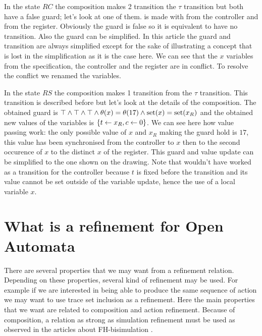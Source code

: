 \documentclass{article}
\begin{document}
\begin{exi}
In the state \(RC\) the composition makes 2 transition  the \(\tau\) transition but both have a false guard; let's look at one of them.
 is made with  from the controller and  from the register.
Obviously the guard is false so  it is equivalent to have no transition.
Also the guard  can be simplified.
In this article the guard and transition are always simplified except for the sake of illustrating a concept that is lost in the simplification as it is the case here.
We can see that the \(x\) variables from the specification, the controller and the register are in conflict.
To resolve the conflict we renamed the variables.

In the state \(RS\) the composition makes 1 transition from the \(\tau\) transition.
This transition is described before but let's look at the details of the composition.
The obtained guard is \(\top \wedge \top \wedge \top \wedge \theta{\left(x\right)} = \theta{\left(17\right)} \wedge \mathrm{set}{\left(x\right)} = \mathrm{set}{\left(x_R\right)}\) and the obtained new values of the variables is \({\left\{t \gets x_R, c \gets 0\right\}}\).
We can see here how value passing work: the only possible value of \(x\) and \(x_R\) making the guard hold is \(17\), this value has been synchronised from the controller to \(x\) then to the second occurence of \(x\) to the distinct \(x\) of the register.
This guard and value update can be simplified to the one shown on the drawing.
Note that  wouldn't have worked as a transition for the controller because \(t\) is fixed before the transition and its value cannot be set outside of the variable update, hence the use of a local variable \(x\).
\end{exi}


\section{What is a refinement for Open Automata}\label{sec:proofelts}
There are several properties that we may want from a refinement relation.
Depending on these properties, several kind of refinement may be used.
For example if we are interested in being able to produce the same sequence of action we may want to use trace set inclusion as a refinement.
Here the main properties that we want are related to composition and action refinement.
Because of composition, a relation as strong as simulation refinement must be used as observed in the articles about FH-bisimulation \cite{henrio:01055091}.
\end{document}
